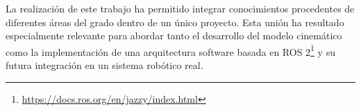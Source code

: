 \newpage

La realización de este trabajo ha permitido integrar conocimientos procedentes de diferentes áreas del grado dentro de un único proyecto. Esta unión ha resultado especialmente relevante para abordar tanto el desarrollo del modelo cinemático como la implementación de una arquitectura software basada en ROS 2\footnote{\url{https://docs.ros.org/en/jazzy/index.html}} y su futura integración en un sistema robótico real.
